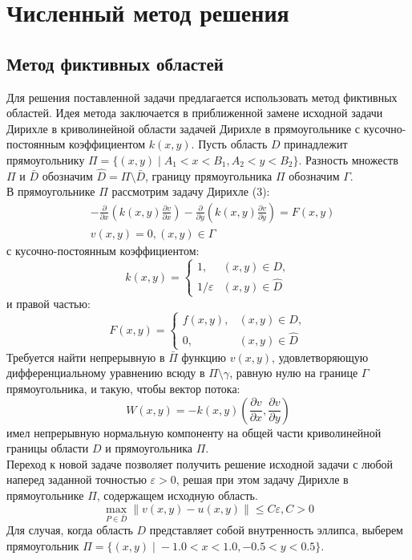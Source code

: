 \documentclass[oneside,final,14pt]{extreport}
\begin{document}
\section{Численный метод решения}
\subsection{Метод фиктивных областей}
\noindent
Для решения поставленной задачи предлагается использовать метод
фиктивных областей. Идея метода заключается в приближенной замене
исходной задачи Дирихле в криволинейной области
задачей Дирихле в прямоугольнике с кусочно-постоянным коэффициентом
\( k(x, y) \). Пусть область \( D \) принадлежит прямоугольнику
\( \Pi = \{(x,y) \; | \; A_1 < x < B_1, A_2 < y < B_2 \} \). Разность
множеств \( \Pi \) и \( \bar D \) обозначим \( \hat D = \Pi \setminus \bar D \),
границу прямоугольника \( \Pi \) обозначим \( \Gamma \).
\\В прямоугольнике \( \Pi \) рассмотрим задачу Дирихле (3):
\[ \begin{aligned}
  & -\frac{\partial}{\partial x}(k(x,y)\frac{\partial v}{\partial x})
  - \frac{\partial}{\partial y}(k(x,y)\frac{\partial v}{\partial y}) = F(x,y)\\
  & v(x, y) = 0, (x, y) \in \Gamma
\end{aligned} \]
с кусочно-постоянным коэффициентом:
\[ k(x, y) = 
\begin{cases}
    1,   & (x, y) \in D, \\
    1 / \varepsilon & (x, y) \in \hat D
\end{cases} \]
и правой частью:
\[ F(x, y) = 
\begin{cases}
    f(x, y),   & (x, y) \in D, \\
    0, & (x, y) \in \hat D
\end{cases} \]
Требуется найти непрерывную в \( \bar \Pi \) функцию \( v(x, y) \),
удовлетворяющую дифференциальному уравнению всюду в \( \Pi \setminus \gamma \),
равную нулю на границе \( \Gamma \) прямоугольника, и такую, чтобы вектор
потока:
\[ W(x, y) = -k(x, y)
    (\frac{\partial v}{\partial x}, \frac{\partial v}{\partial y})
\]
имел непрерывную нормальную компоненту на общей части криволинейной границы
области \( D \) и прямоугольника \( \Pi \). \\
Переход к новой задаче позволяет получить решение исходной задачи
с любой наперед заданной точностью \( \varepsilon > 0 \), решая при этом
задачу Дирихле в прямоугольнике \( \Pi \), содержащем исходную область.
\[ \max_{P \in \bar D} \|v(x, y) - u(x, y) \| \le C \varepsilon, C > 0 \]
Для случая, когда область \( D \) представляет собой внутренность эллипса,
выберем прямоугольник
\( \Pi = \{(x,y) \; | \; -1.0 < x < 1.0, -0.5 < y < 0.5 \} \).
\end{document}

